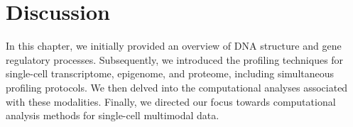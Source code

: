 
\section{Discussion}
\label{background:Discussion}
In this chapter, we initially provided an overview of DNA structure and gene regulatory processes. Subsequently, we introduced the profiling techniques for single-cell transcriptome, epigenome, and proteome, including simultaneous profiling protocols. We then delved into the computational analyses associated with these modalities. Finally, we directed our focus towards computational analysis methods for single-cell multimodal data. 
